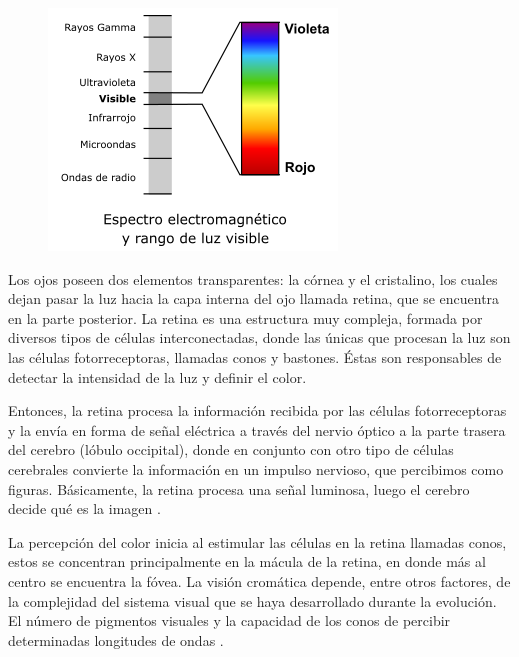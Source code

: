 \documentclass[10pt]{article}
\begin{document}
\begin{figure}[H]
	\begin{center}
\includegraphics[scale = 0.85]{Imagenes/espectro.png}
	\end{center} 
\end{figure}

Los ojos poseen dos elementos transparentes: la córnea y el cristalino, los cuales dejan pasar la luz hacia la capa interna del ojo llamada retina, que se encuentra en la parte posterior. La retina es una estructura muy compleja, formada por diversos tipos de células interconectadas, donde las únicas que procesan la luz son las células fotorreceptoras, llamadas conos y bastones. Éstas son responsables de detectar la intensidad de la luz y definir el color.

\setlength{\parskip}{2mm}

Entonces, la retina procesa la información recibida por las células fotorreceptoras y la envía en forma de señal eléctrica a través del nervio óptico a la parte trasera del cerebro (lóbulo occipital), donde en conjunto con otro tipo de células cerebrales convierte la información en un impulso nervioso, que percibimos como figuras. Básicamente, la retina procesa una señal luminosa, luego el cerebro decide qué es la imagen \cite{IEEEreferencias:Ref12}.

\setlength{\parskip}{2mm}

La percepción del color inicia al estimular las células en la retina llamadas conos, estos  se concentran principalmente en la mácula de la retina, en donde más al centro se encuentra la fóvea. La visión cromática depende, entre otros factores, de la complejidad del sistema visual que se haya desarrollado durante la evolución. El número de pigmentos visuales y la capacidad de los conos de percibir determinadas longitudes de ondas \cite{IEEEreferencias:Ref12}.
\end{document}
